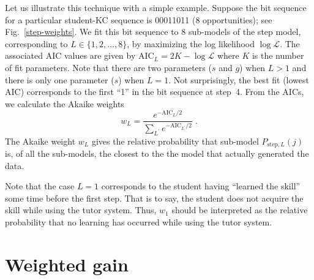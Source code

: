 \documentclass{edm_template}
\begin{document}
Let us illustrate this technique with a simple example.  Suppose the
bit sequence for a particular student-KC sequence is 00011011 (8
opportunities); see Fig.~\ref{step-weights}.  We fit this bit sequence to 8
sub-models of the step model, corresponding to $L\in\{1,2,\ldots,8\}$,
by maximizing the log likelihood $\log\mathcal{L}$.  The associated
AIC values are given by $\mathrm{AIC}_L=2 K-\log \mathcal{L}$ where
$K$ is the number of fit parameters.  Note that there are two
parameters ($s$ and $g$) when $L>1$ and there is only one parameter
($s$) when $L=1$.
%
%
Not surprisingly, the best fit (lowest AIC) corresponds to the first
``1'' in the bit sequence at step~4.  From the AICs, we calculate 
the Akaike weights
%
\begin{equation}
     w_L=\frac{e^{-\mathrm{AIC}_L/2} }{\sum_{L^\prime}
       e^{-\mathrm{AIC}_{L^\prime}/2}} \; .
\end{equation}
%
The Akaike weight $w_L$ gives the relative probability that sub-model 
$P_{\mathrm{step},L}(j)$ is, of all the sub-models, the closest to the 
the model that actually generated the data.


Note that the case $L=1$ corresponds to the student having 
``learned the skill'' some time before the first step.  That is to say, 
the student does not acquire the skill while using the tutor system.
Thus, $w_1$ should be interpreted as the relative probability
that no learning has occurred while using the tutor system.

\section{Weighted gain}
\end{document}
